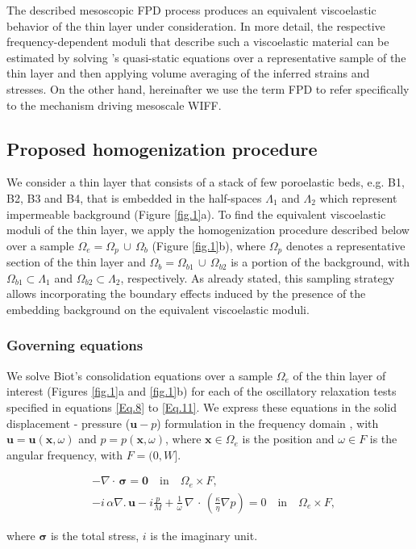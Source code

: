 \documentclass[draft]{agujournal2019}
\begin{document}
The described mesoscopic FPD process produces an equivalent viscoelastic behavior of the thin layer under consideration. In more detail, the respective frequency-dependent  moduli that describe such a viscoelastic material can be estimated by solving \citeauthor{Biot1941}'s \citeyear{Biot1941} quasi-static equations over a representative sample of the thin layer and then applying volume averaging of the inferred strains and stresses. On the other hand, hereinafter we use the term FPD to refer specifically to the mechanism driving mesoscale WIFF.

\subsection{Proposed homogenization procedure}
We consider a thin layer that consists of a stack of few poroelastic beds, e.g. B1, B2, B3 and B4, that is embedded in the half-spaces $\Lambda_1$ and $\Lambda_2$ which represent impermeable background (Figure \ref{fig.1}a). To find the equivalent viscoelastic moduli of the thin layer, we apply the homogenization procedure described below over a sample $\Omega_e = \Omega_p \,\cup \, \Omega_b$ (Figure \ref{fig.1}b), where $\Omega_p$ denotes a representative section of the thin  layer and $\Omega_b =\Omega_{b1}\, \cup \, \Omega_{b2}$ is a portion of the background, with $\Omega_{b1} \subset \Lambda_1$ and $\Omega_{b2} \subset \Lambda_2$, respectively. As already stated, this sampling strategy allows incorporating the boundary effects induced by the presence of the embedding background on the equivalent viscoelastic moduli.


\subsubsection{Governing equations}
We solve Biot's consolidation equations \cite{Biot1941, Biot1962} over a sample  $\Omega_e$ of the thin layer of interest (Figures \ref{fig.1}a and \ref{fig.1}b) for each of the oscillatory relaxation tests specified in equations
\eqref{Eq.8} to \eqref{Eq.11}. We express these equations in the solid displacement - pressure ($\bm{u}-p$) formulation in the frequency domain \cite{Quintal2011,Favino2020},  with $\bm{u} = \bm{u}(\bm{x}, \omega)$ and $p = p(\bm{x},\omega)$, where $\bm{x} \in \Omega_e$ is the position and $\omega \in F$ is the angular frequency, with $F =(0,W]$. 
\begin{linenomath*}
\begin{equation}\label{Eq.6}
\begin{split}
& - \nabla \cdot \, \bm{\sigma} = \bm{0}  \quad  \textrm{in} \quad \Omega_e \times F,  \\
& - i \, \alpha \nabla . \, \bm{u} -i \frac{p}{M} + \frac{1}{\omega} \,\nabla \, \cdot \, \left( \frac{\kappa}{\eta} \nabla p\right)  =0 \quad  \textrm{in} \quad \Omega_e \times F,
\end{split}
\end{equation}
\end{linenomath*}
where $\bm{\sigma}$ is the total stress, $i$ is the imaginary unit.
\end{document}
